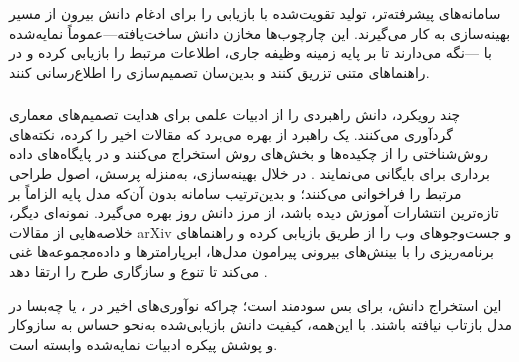 سامانه‌های پیشرفته‌تر، تولید تقویت‌شده با بازیابی را برای ادغام دانش بیرون از مسیر بهینه‌سازی به کار می‌گیرند. این چارچوب‌ها مخازن دانش ساخت‌یافته—عموماً  نمایه‌شده با —نگه می‌دارند تا بر پایه زمینه وظیفه جاری، اطلاعات مرتبط را بازیابی کرده و در راهنماهای متنی تزریق کنند و بدین‌سان تصمیم‌سازی را اطلاع‌رسانی کنند.

\subsubsection{\protect{}}

چند رویکرد، دانش راهبردی را از ادبیات علمی برای هدایت تصمیم‌های معماری گردآوری می‌کنند. یک راهبرد از  بهره می‌برد که مقالات اخیر را  کرده، نکته‌های روش‌شناختی را از چکیده‌ها و بخش‌های روش استخراج می‌کنند و در پایگاه‌های داده برداری برای  بایگانی می‌نمایند \cite{Yang2025NADER}. در خلال بهینه‌سازی،  به‌منزله پرسش، اصول طراحی مرتبط را فراخوانی می‌کنند؛ و بدین‌ترتیب سامانه بدون آن‌که مدل پایه الزاماً بر تازه‌ترین انتشارات آموزش دیده باشد، از مرز دانش روز بهره می‌گیرد. نمونه‌ای دیگر، خلاصه‌هایی از مقالات arXiv و جست‌وجوهای وب را از طریق  بازیابی کرده و راهنماهای برنامه‌ریزی را با بینش‌های بیرونی پیرامون مدل‌ها، ابرپارامترها و داده‌مجموعه‌ها غنی می‌کند تا تنوع و سازگاری طرح را ارتقا دهد \cite{trirat2025automlagent}.

این استخراج دانش، برای  بس سودمند است؛ چراکه نوآوری‌های اخیر در ،  یا  چه‌بسا در  مدل بازتاب نیافته باشند. با این‌همه، کیفیت دانش بازیابی‌شده به‌نحو حساس به سازوکار  و پوشش پیکره ادبیات نمایه‌شده وابسته است.

\subsubsection{\protect{}}


